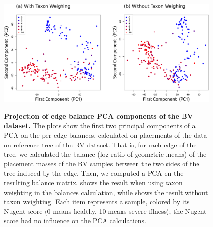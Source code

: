 \begin{figure}[!htb]
    \centering
    \includegraphics[width=\linewidth]{pdf/bv_place_edge_balances_pca_scatter.pdf}
    \begin{subfigure}{0pt}
        \label{fig:bv_place_edge_balances_pca_scatter:sub:with_taxon_weighting}
    \end{subfigure}
    \begin{subfigure}{0pt}
        \label{fig:bv_place_edge_balances_pca_scatter:sub:without_taxon_weighting}
    \end{subfigure}
    \caption[Projection of edge balance PCA components of the \acs{BV} dataset]{
        \textbf{Projection of edge balance PCA components of the \ac{BV} dataset.}
        The plots show the first two principal components of a PCA on the per-edge balances,
        calculated on placements of the data on reference tree of the \ac{BV} dataset.
        That is, for each edge of the tree, we calculated the balance (log-ratio of geometric means)
        of the placement masses of the \ac{BV} samples between the two sides of the tree induced by the edge.
        Then, we computed a PCA on the resulting balance matrix.
         shows the result when
        using taxon weighting \cite{Silverman2017} in the balances calculation,
        while  shows the result
        without taxon weighting.
        Each item represents a sample, colored by its Nugent score (0 means healthy, 10 means severe illness);
        the Nugent score had no influence on the PCA calculations.
    }
    \label{fig:bv_place_edge_balances_pca_scatter}
\end{figure}

